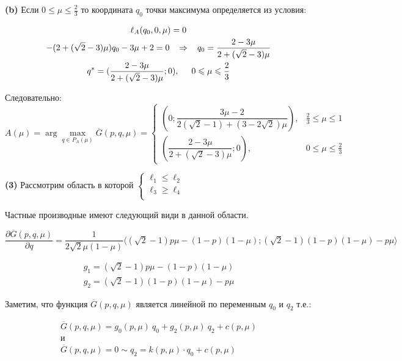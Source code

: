 	\textbf{(b)} Если $0 \leqslant \mu \leqslant \frac{2}{3}$ то координата $q_0$ точки 
	максимума определяется из условия: 	
	
	\begin{gather*}
		\ell_A(q_0,0,\mu)=0	
		\\
		-(2+(\sqrt{2}-3)\mu)q_0
		-3\mu+2=0	
		\hspace{3mm} \Rightarrow \hspace{3mm}
		q_0=\frac{2-3\mu}{2+(\sqrt{2}-3)\mu}	
		\\
		q^*= (\dfrac{2-3\mu}{2+(\sqrt{2}-3)\mu};0), 
		\hspace{5mm} 0 \leqslant \mu \leqslant \frac{2}{3}	
	\end{gather*}
	
	Следовательно:
	\begin{equation} \label{eq:A}
		A(\mu) = \arg \max \limits_{q\in P_A(\mu)} \overline G(p,q,\mu) = 
		\begin{cases}
			(0;\dfrac{3\mu-2}{2(\sqrt{2}-1)+(3-2\sqrt{2})\mu})
			, & \frac{2}{3} \leqslant \mu \leqslant 1 \\
			(\dfrac{2-3\mu}{2+(\sqrt{2}-3)\mu};0), & 0 \leqslant \mu \leqslant \frac{2}{3}	
		\end{cases}
	\end{equation}


	\textbf{(3)} Рассмотрим область в которой
	$\begin{cases}
		\ell_1 \leqslant \ell_2 \\	
		\ell_3 \geqslant \ell_4 \\
	\end{cases}	
	$
	
	Частные производные имеют следующий види в данной области.
	
	$
	\dfrac{\partial \overline{G}(p,q,\mu)}{\partial q}=
	\dfrac{1}{2\sqrt{2}\mu(1-\mu)}
	\big \langle 
		(\sqrt{2} - 1)p\mu -(1-p)(1-\mu);
		(\sqrt{2} - 1)(1-p)(1-\mu) - p\mu			
	\big \rangle
	$

	\begin{gather*}
	g_1=(\sqrt{2} - 1)p\mu -(1-p)(1-\mu) \\
	g_2=(\sqrt{2} - 1)(1-p)(1-\mu) - p\mu
	\end{gather*}

 	Заметим, что функция $\overline{G}(p,q,\mu)$
 	является линейной по переменным $q_0$ и $q_2$ т.е.:

	\begin{gather*}
	\overline{G}(p,q,\mu)=g_0(p,\mu) \: q_0+g_2(p,\mu) \: q_2+c(p,\mu)
	\\
	\textrm{и}
	\\
	\overline{G}(p,q,\mu) = 0 \sim q_2 = k(p, \mu) \cdot q_0 + c(p, \mu)	
	\end{gather*}
	
